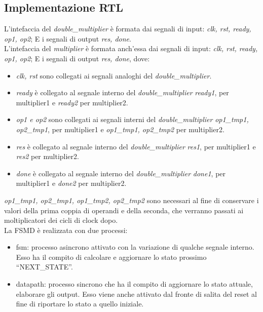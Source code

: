 \documentclass[]{IEEEtran}
\begin{document}
\subsection{Implementazione RTL}
L'intefaccia del {\it double\_multiplier} è formata dai segnali di input: {\it clk, rst, ready, op1, op2}; E i segnali di output {\it res, done}. \\
L'intefaccia del {\it multiplier} è formata anch'essa dai segnali di input: {\it clk, rst, ready, op1, op2}; E i segnali di output {\it res, done}, dove:
\begin{itemize}
\item {\it clk, rst} sono collegati ai segnali analoghi del {\it double\_multiplier}.
\item {\it ready} è collegato al segnale interno del {\it double\_multiplier} {\it ready1}, per multiplier1 e {\it ready2} per multiplier2.
\item {\it op1 e op2} sono collegati ai segnali interni del {\it double\_multiplier} {\it op1\_tmp1, op2\_tmp1}, per multiplier1 e {\it op1\_tmp1, op2\_tmp2} per multiplier2.
\item {\it res} è collegato al segnale interno del {\it double\_multiplier} {\it res1}, per multiplier1 e {\it res2} per multiplier2.
\item {\it done} è collegato al segnale interno del {\it double\_multiplier} {\it done1}, per multiplier1 e {\it done2} per multiplier2.
\end{itemize}
{\it op1\_tmp1, op2\_tmp1, op1\_tmp2, op2\_tmp2} sono necessari al fine di conservare i valori della prima coppia di operandi e della seconda, che verranno passati ai moltiplicatori dei cicli di clock dopo. \\
La FSMD è realizzata con due processi:
\begin{itemize}
\item fsm: processo asincrono attivato con la variazione di qualche segnale interno. Esso ha il compito di calcolare e aggiornare lo stato prossimo ``NEXT\_STATE''.
\item datapath: processo sincrono che ha il compito di aggiornare lo stato attuale, elaborare gli output. Esso viene anche attivato dal fronte di salita del reset al fine di riportare lo stato a quello iniziale.
\end{itemize}
\end{document}
